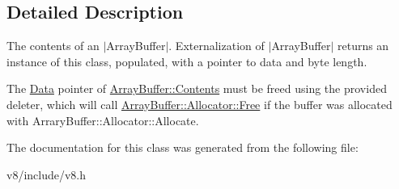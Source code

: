 \subsection{Detailed Description}
The contents of an $\vert$\+Array\+Buffer$\vert$. Externalization of $\vert$\+Array\+Buffer$\vert$ returns an instance of this class, populated, with a pointer to data and byte length.

The \mbox{\hyperlink{classv8_1_1Data}{Data}} pointer of \mbox{\hyperlink{classv8_1_1ArrayBuffer_1_1Contents}{Array\+Buffer\+::\+Contents}} must be freed using the provided deleter, which will call \mbox{\hyperlink{classv8_1_1ArrayBuffer_1_1Allocator_a419f59d2a103a5a8863809d7977c9cd8}{Array\+Buffer\+::\+Allocator\+::\+Free}} if the buffer was allocated with Arrary\+Buffer\+::\+Allocator\+::\+Allocate. 

The documentation for this class was generated from the following file\+:\begin{DoxyCompactItemize}
\item 
v8/include/v8.\+h\end{DoxyCompactItemize}
